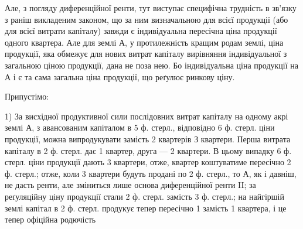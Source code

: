 Але, з погляду диференційної ренти, тут виступає специфічна трудність
в зв’язку з раніш викладеним законом, що за ним визначальною для всієї продукції
(або для всієї витрати капіталу) завжди є індивідуальна пересічна ціна
продукції одного квартера. Але для землі $А$, у протилежність кращим родам
землі, ціна продукції, яка обмежує для нових витрат капіталу вирівняння індивідуальної
з загальною ціною продукції, дана не поза нею. Бо індивідуальна ціна
продукції на $А$ і є та сама загальна ціна продукції, що реґулює ринкову ціну.

Припустімо:

1) За висхідної продуктивної сили послідовних витрат
капіталу на одному акрі землі $А$, з авансованим капіталом в 5 ф. стерл.,
відповідно 6 ф. стерл. ціни продукції, можна випродукувати замість 2 квартерів
З квартери. Перша витрата капіталу в 2 ф. стерл. дає 1 квартер, друга — 2 квартери. В цьому
випадку 6 ф. стерл. ціни продукції дають 3 квартери,
отже, квартер коштуватиме пересічно 2 ф. стерл.; отже, коли 3 квартери
будуть продані по 2 ф. стерл., то $А$, як і давніш, не дасть ренти, але зміниться
лише основа диференційної ренти II; за реґуляційну ціну продукції стали
2 ф. стерл. замість 3 ф. стерл.; на найгіршій землі капітал в 2  ф. стерл.
продукує тепер пересічно 1  замість 1 квартера, і це тепер офіційна родючість
\parbreak{}  %
